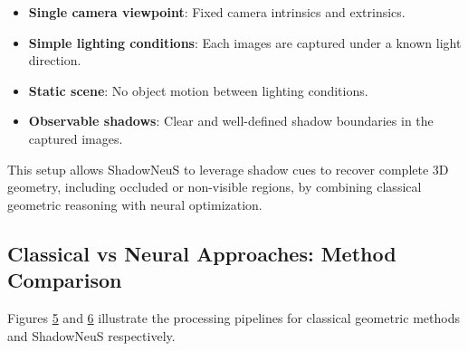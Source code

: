 \documentclass[12pt,a4paper]{article}
\theoremstyle{definition}
\begin{document}
\begin{itemize}
    \item \textbf{Single camera viewpoint}: Fixed camera intrinsics and extrinsics.
    \item \textbf{Simple lighting conditions}: Each images are captured under a known light direction.
    \item \textbf{Static scene}: No object motion between lighting conditions.
    \item \textbf{Observable shadows}: Clear and well-defined shadow boundaries in the captured images.
\end{itemize}

This setup allows ShadowNeuS to leverage shadow cues to recover complete 3D geometry, including occluded or non-visible regions, by combining classical geometric reasoning with neural optimization.

\subsection{Classical vs Neural Approaches: Method Comparison} \label{sec:method_comparison}

Figures \hyperlink{fig:classical_method}{5} and \hyperlink{fig:neural_method}{6} illustrate the processing pipelines for classical geometric methods and ShadowNeuS respectively.

\vspace{-1em}
\end{document}
